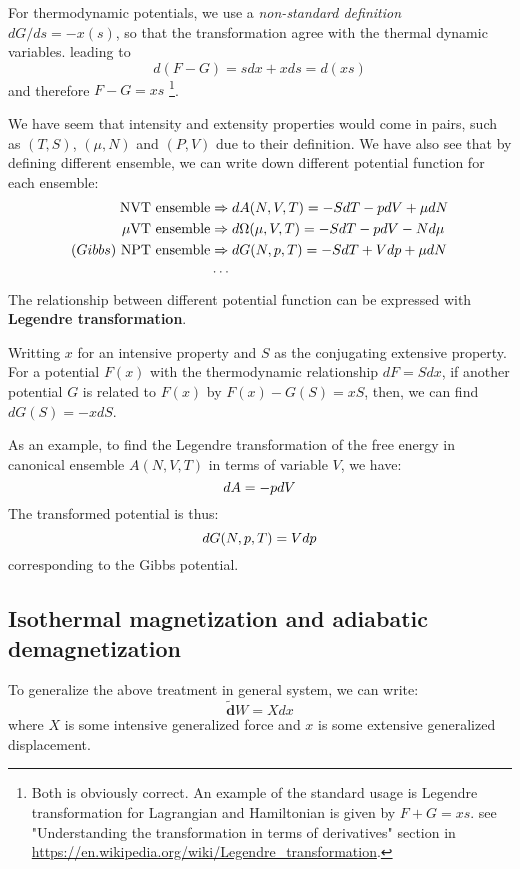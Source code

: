 \documentclass{article}
\newcommand{\dbar}{\mathbf{\tilde{d}}}
\begin{document}
For thermodynamic potentials, we use a \emph{non-standard definition} $dG/ds = -x(s)$, 
so that the transformation agree with the thermal dynamic variables.
leading to 
\begin{equation}
    d(F-G) = sdx + xds = d(xs)
\end{equation}
and therefore $F-G = xs$
\footnote{
    Both is obviously correct. An example of the standard usage is Legendre transformation 
    for Lagrangian and Hamiltonian is given by $F+G = xs$. see "Understanding the transformation in terms of derivatives"
    section in \url{https://en.wikipedia.org/wiki/Legendre_transformation}.
}.

We have seem that intensity and extensity properties would come in pairs, such as $(T,S)$, $(\mu,N)$
and $(P,V)$ due to their definition. We have also see that by defining different ensemble, we can
write down different potential function for each ensemble:
\begin{align}
    \text{NVT ensemble} &\Rightarrow dA(N,V,T) = -SdT - pdV + \mu dN\notag \\
    \text{$\mu$VT ensemble} &\Rightarrow d\Omega(\mu,V,T) = -SdT - pdV - Nd\mu \notag \\
    (Gibbs)\ \text{NPT ensemble} &\Rightarrow dG(N,p,T) = -SdT + Vdp + \mu dN \notag \\
    &\cdots \notag
\end{align}
The relationship between different potential function can be expressed with \textbf{Legendre transformation}.

Writting $x$ for an intensive property and $S$ as the conjugating extensive property. For a potential $F(x)$
with the thermodynamic relationship $dF = Sdx$, if another potential $G$ is related to $F(x)$ by $F(x) - G(S) = xS$,
then, we can find $dG(S) = -xdS$.

As an example, to find the Legendre transformation of the free energy in canonical ensemble $A(N,V,T)$ in terms of 
variable $V$, we have:
\begin{equation}
    dA = -pdV \notag
\end{equation} 
The transformed potential is thus:
\begin{equation}
    dG(N,p,T) = Vdp \notag
\end{equation} 
corresponding to the 
Gibbs potential. 

\subsection{Isothermal magnetization and adiabatic demagnetization}
To generalize the above treatment in general system, we can write:
\begin{equation}
    \dbar W = X dx
\end{equation}
where $X$ is some intensive generalized force and $x$ is some 
extensive generalized displacement.
\end{document}
